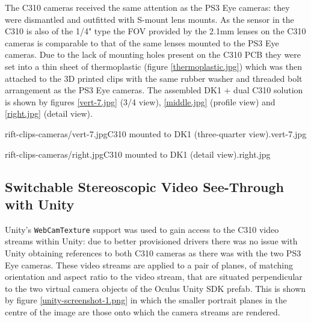 The C310 cameras received the same attention as the PS3 Eye cameras: they were dismantled and outfitted with S-mount lens mounts. As the sensor in the C310 is also of the 1/4" type the FOV provided by the 2.1mm lenses on the C310 cameras is comparable to that of the same lenses mounted to the PS3 Eye cameras. Due to the lack of mounting holes present on the C310 PCB they were set into a thin sheet of thermoplastic (figure \ref{thermoplastic.jpg}) which was then attached to the 3D printed clips with the same rubber washer and threaded bolt arrangement as the PS3 Eye cameras. The assembled DK1 + dual C310 solution is shown by figures \ref{vert-7.jpg} (3/4 view), \ref{middle.jpg} (profile view) and \ref{right.jpg} (detail view).

       {rift-clips-cameras/vert-7.jpg}{C310 mounted to DK1 (three-quarter view).}{vert-7.jpg}

       {rift-clips-cameras/right.jpg}{C310 mounted to DK1 (detail view).}{right.jpg}


\subsection{Switchable Stereoscopic Video See-Through with Unity}

Unity's \texttt{WebCamTexture} support was used to gain access to the C310 video streams within Unity: due to better provisioned drivers there was no issue with Unity obtaining references to both C310 cameras as there was with the two PS3 Eye cameras. These video streams are applied to a pair of planes, of matching orientation and aspect ratio to the video stream, that are situated perpendicular to the two virtual camera objects of the Oculus Unity SDK prefab. This is shown by figure \ref{unity-screenshot-1.png} in which the smaller portrait planes in the centre of the image are those onto which the camera streams are rendered.

